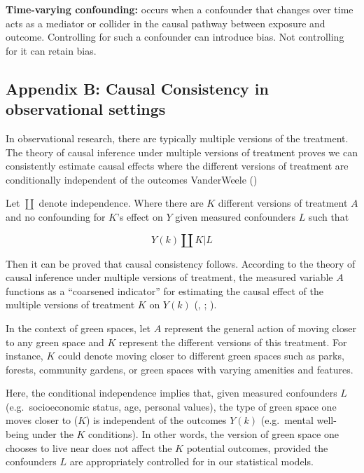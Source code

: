 \documentclass[
  singlecolumn]{article}
\begin{document}
\textbf{Time-varying confounding:} occurs when a confounder that changes
over time acts as a mediator or collider in the causal pathway between
exposure and outcome. Controlling for such a confounder can introduce
bias. Not controlling for it can retain bias.

\newpage{}

\subsection{Appendix B: Causal Consistency in observational
settings}\label{appendix-b}

In observational research, there are typically multiple versions of the
treatment. The theory of causal inference under multiple versions of
treatment proves we can consistently estimate causal effects where the
different versions of treatment are conditionally independent of the
outcomes VanderWeele ()

Let \(\coprod\) denote independence. Where there are \(K\) different
versions of treatment \(A\) and no confounding for \(K\)'s effect on
\(Y\) given measured confounders \(L\) such that

\[
Y(k) \coprod K | L
\]

Then it can be proved that causal consistency follows. According to the
theory of causal inference under multiple versions of treatment, the
measured variable \(A\) functions as a ``coarsened indicator'' for
estimating the causal effect of the multiple versions of treatment \(K\)
on \(Y(k)\) (,
;
).

In the context of green spaces, let \(A\) represent the general action
of moving closer to any green space and \(K\) represent the different
versions of this treatment. For instance, \(K\) could denote moving
closer to different green spaces such as parks, forests, community
gardens, or green spaces with varying amenities and features.

Here, the conditional independence implies that, given measured
confounders \(L\) (e.g.~socioeconomic status, age, personal values), the
type of green space one moves closer to (\(K\)) is independent of the
outcomes \(Y(k)\) (e.g.~mental well-being under the \(K\) conditions).
In other words, the version of green space one chooses to live near does
not affect the \(K\) potential outcomes, provided the confounders \(L\)
are appropriately controlled for in our statistical models.
\end{document}
